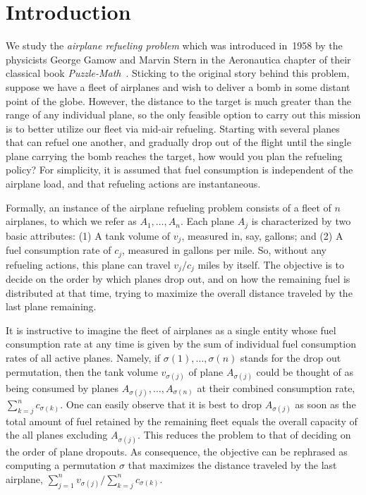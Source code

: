 \documentclass[11pt]{article}
\theoremstyle{plain}
\theoremstyle{definition}
\begin{document}
\section{Introduction} \label{sec:intro}

We study the \textit{airplane refueling problem} which was introduced in~1958 by the physicists George Gamow and Marvin Stern in the Aeronautica chapter of their classical book \textit{Puzzle-Math}~\cite{GamowS58}. Sticking to the original story behind this problem, suppose we have a fleet of airplanes and wish to deliver a bomb in some distant point of the globe. However, the distance to the target is much greater than the range of any individual plane, so the only feasible option to carry out this mission is to better utilize our fleet via mid-air refueling. Starting with several planes that can refuel one another, and gradually drop out of the flight until the single plane carrying the bomb reaches the target, how would you plan the refueling policy? For simplicity, it is assumed that fuel consumption is independent of the airplane load, and that refueling actions are instantaneous.

\smallskip {} Formally, an instance of the airplane refueling problem consists of a fleet of $n$ airplanes, to which we refer as $A_1, \ldots, A_n$. Each plane $A_j$ is characterized by two basic attributes: (1) A tank volume of $v_j$, measured in, say, gallons; and (2) A fuel consumption rate of $c_j$, measured in gallons per mile. So, without any refueling actions, this plane can travel $v_j / c_j$ miles by itself. The objective is to decide on the order by which planes drop out, and on how the remaining fuel is distributed at that time, trying to maximize the overall distance traveled by the last plane remaining.

It is instructive to imagine the fleet of airplanes as a single entity whose fuel consumption rate at any time is given by the sum of individual fuel consumption rates of all active planes. Namely, if $\sigma(1), \ldots, \sigma(n)$ stands for the drop out permutation, then the tank volume $v_{ \sigma(j) }$ of plane $A_{ \sigma(j) }$ could be thought of as being consumed by planes $A_{ \sigma(j) }, \ldots, A_{ \sigma(n) }$ at their combined consumption rate, $\sum_{k = j}^n c_{ \sigma(k) }$. One can easily observe that it is best to drop $A_{ \sigma(j) }$ as soon as the total amount of fuel retained by the remaining fleet equals the overall capacity of the all planes excluding $A_{ \sigma(j) }$. This reduces the problem to that of deciding on the order of plane dropouts. As consequence, the objective can be rephrased as computing a permutation $\sigma$ that maximizes the distance traveled by the last airplane, $\sum_{j = 1}^n v_{\sigma(j)}/ \sum_{k = j}^n c_{ \sigma(k) }$.
\end{document}
